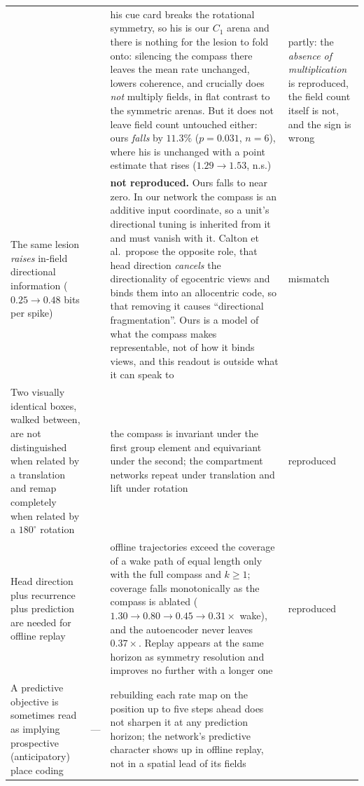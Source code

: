 \documentclass[9pt,lineno]{elife}
\begin{document}
\begin{table}[t]
\begin{tabular}{p{}p{}p{}p{}}
& \citet{calton2003} & his cue card breaks the rotational symmetry, so his is our $C_1$ arena and
there is nothing for the lesion to fold onto: silencing the compass there leaves the mean rate
unchanged, lowers coherence, and crucially does \emph{not} multiply fields, in flat contrast to the
symmetric arenas. But it does not leave field count untouched either: ours \emph{falls} by
$11.3\%$ ($p = 0.031$, $n = 6$), where his is unchanged with a point estimate that rises
($1.29 \to 1.53$, n.s.)
& partly: the \emph{absence of multiplication} is reproduced, the field count itself is not,
and the sign is wrong \\[4pt]
The same lesion \emph{raises} in-field directional information ($0.25 \to 0.48$ bits per spike)
& \citet{calton2003} & \textbf{not reproduced.} Ours falls to near zero. In our network the compass
is an additive input coordinate, so a unit's directional tuning is inherited from it and must vanish
with it. Calton et al.\ propose the opposite role, that head direction \emph{cancels} the
directionality of egocentric views and binds them into an allocentric code, so that removing it
causes ``directional fragmentation''. Ours is a model of what the compass makes representable, not
of how it binds views, and this readout is outside what it can speak to
& mismatch \\[4pt]
Two visually identical boxes, walked between, are not distinguished when related by a translation
and remap completely when related by a $180^\circ$ rotation
& \citet{fuhs2005} & the compass is invariant under the first group element and equivariant under
the second; the compartment networks repeat under translation and lift under rotation
& reproduced \\[4pt]
Head direction plus recurrence plus prediction are needed for offline replay
& \citet{levenstein2024} & offline trajectories exceed the coverage of a wake path of equal
length only with the full compass and $k \ge 1$; coverage falls monotonically as the compass
is ablated ($1.30 \to 0.80 \to 0.45 \to 0.31 \times$ wake), and the autoencoder never leaves
$0.37\times$. Replay appears at the same horizon as symmetry resolution and improves no
further with a longer one
& reproduced \\[4pt]
A predictive objective is sometimes read as implying prospective (anticipatory) place coding
& --- & rebuilding each rate map on the position up to five steps ahead does not sharpen it at
any prediction horizon; the network's predictive character shows up in offline replay, not in a
spatial lead of its fields

\end{tabular}
\end{table}
\end{document}
